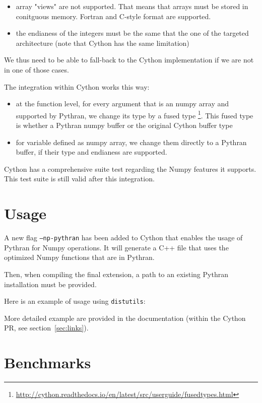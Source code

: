 \documentclass{deliverablereport}
\begin{document}
\begin{itemize}
  \item array "views" are not supported. That means that arrays must be stored
    in conitguous memory. Fortran and C-style format are supported.
  \item the endianess of the integers must be the same that the one of the
    targeted architecture (note that Cython has the same limitation)
\end{itemize}

We thus need to be able to fall-back to the Cython implementation if we are not
in one of those cases.

The integration within Cython works this way:

\begin{itemize}
  \item at the function level, for every argument that is an numpy array and
    supported by Pythran, we change its type by a fused type
    \footnote{\url{http://cython.readthedocs.io/en/latest/src/userguide/fusedtypes.html}}.
    This fused type is whether a Pythran numpy buffer or the original Cython
    buffer type
  \item for variable defined as numpy array, we change them directly to a
    Pythran buffer, if their type and endianess are supported.
\end{itemize}

Cython has a comprehensive suite test regarding the Numpy features it supports.
This test suite is still valid after this integration.

\section{Usage}

A new flag {\tt --np-pythran} has been added to Cython that enables the usage
of Pythran for Numpy operations. It will generate a C++ file that uses the
optimized Numpy functions that are in Pythran.

Then, when compiling the final extension, a path to an existing Pythran
installation must be provided.

Here is an example of usage using {\tt distutils}:

More detailed example are provided in the documentation (within the Cython PR,
see section~\ref{sec:links}).

\section{Benchmarks}
\end{document}
